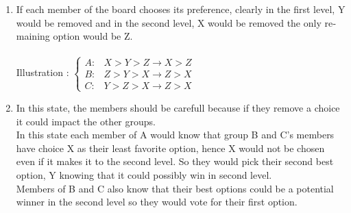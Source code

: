 \noindent

\begin{enumerate}
    \item \phantom{text}
          \begin{latin}        \noindent
              If each member of the board chooses its preference, clearly in the first level, Y would be removed and in the second level, X would be removed the only remaining option would be Z.\\\\
              Illustration :
              $
                  \begin{cases}
                      A : & X > Y > Z \rightarrow X > Z \\
                      B : & Z > Y > X \rightarrow Z > X \\
                      C : & Y > Z > X \rightarrow Z > X
                  \end{cases}
              $
          \end{latin}
    \item \phantom{text} \begin{latin}
              \noindent
            In this state, the members should be carefull because if they remove a choice it could impact the other groups.\\
            In this state each member of A would know that group B and C's members have choice X as their least favorite option, hence X would not be chosen even if it makes it to the second level. So 
            they would pick their second best option, Y knowing that it could possibly win in second level.\\
            Members of B and C also know that their best options could be a potential winner in the second level so they would vote for their first option.
          \end{latin}
\end{enumerate}